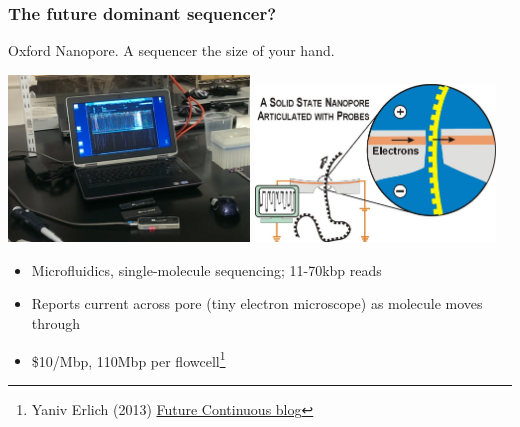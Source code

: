 \begin{frame}
  \frametitle{The future dominant sequencer?}
  Oxford Nanopore. A sequencer the size of your hand.
    \begin{center}
      \includegraphics[width=0.48\textwidth]{images/minion_run}\thinspace
      \includegraphics[width=0.48\textwidth]{images/nanopore_schematic}
    \end{center} 
    \begin{itemize}
      \item Microfluidics, single-molecule sequencing; 11-70kbp reads
      \item Reports current across pore (tiny electron microscope) as molecule moves through
      \item \$10/Mbp, 110Mbp per flowcell\footnote{\tiny{Yaniv Erlich (2013) \href{http://erlichya.tumblr.com/post/66376172948/hands-on-experience-with-oxford-nanopore-minion}{Future Continuous blog}}}
    \end{itemize}          
\end{frame}

